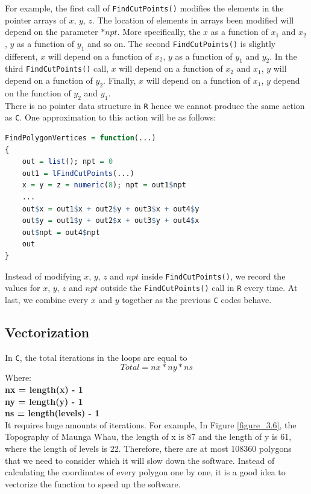 \documentclass[11pt,twoside]{report}
\begin{document}
For example, the first call of \texttt{FindCutPoints()} modifies the elements in the pointer arrays of $x$, $y$, $z$. The location of elements in arrays been modified will depend on the parameter $*npt$. More specifically, the $x$ as a function of $x_1$ and $x_2$, $y$ as a function of $y_1$ and so on. The second \texttt{FindCutPoints()} is slightly different, $x$ will depend on a function of $x_2$, $y$ as a function of $y_1$ and $y_2$. In the third \texttt{FindCutPoints()} call, $x$ will depend on a function of $x_2$ and $x_1$, $y$ will depend on a function of $y_2$. Finally, $x$ will depend on a function of $x_1$, $y$ depend on the function of $y_2$ and $y_1$. \\

There is no pointer data structure in \texttt{R} hence we cannot produce the same action as \texttt{C}. One approximation to this action will be as follows:
\begin{lstlisting}[language = R]
FindPolygonVertices = function(...)
{
    out = list(); npt = 0
    out1 = lFindCutPoints(...)
    x = y = z = numeric(8); npt = out1$npt
    ...
    out$x = out1$x + out2$y + out3$x + out4$y
    out$y = out1$y + out2$x + out3$y + out4$x
    out$npt = out4$npt
    out
}
\end{lstlisting}
Instead of modifying  $x$, $y$, $z$ and $npt$ inside \texttt{FindCutPoints()}, we record the values for $x$, $y$, $z$ and $npt$ outside the \texttt{FindCutPoints()} call in \texttt{R} every time. At last, we combine every $x$ and $y$ together as the previous \texttt{C} codes behave. 


\subsection{Vectorization}
In \texttt{C}, the total iterations in the loops are equal to
\begin{equation}
Total = nx * ny * ns
\end{equation}
Where:\\
\textbf{nx = length(x) - 1}\\
\textbf{ny = length(y) - 1}\\
\textbf{ns = length(levels) - 1}\\

It requires huge amounts of iterations. For example, In Figure \ref{figure_3.6}, the Topography of Maunga Whau, the length of x is 87 and the length of y is 61, where the length of levels is 22. Therefore, there are at most 108360 polygons that we need to consider which it will slow down the software. Instead of calculating the coordinates of every polygon one by one, it is a good idea to vectorize the function to speed up the software.
\end{document}
